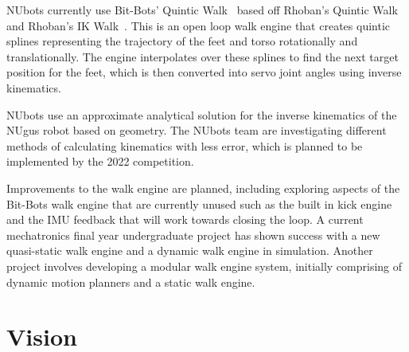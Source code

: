 \documentclass{llncs}
\begin{document}

\medskip

NUbots currently use Bit-Bots' Quintic Walk~\cite{bitbotsMotionGit} based off Rhoban's Quintic Walk~\cite{rhobanModelGit} and Rhoban's IK Walk~\cite{rhobanModelGit}. This is an open loop walk engine that creates quintic splines representing the trajectory of the feet and torso rotationally and translationally. The engine interpolates over these splines to find the next target position for the feet, which is then converted into servo joint angles using inverse kinematics.

NUbots use an approximate analytical solution for the inverse kinematics of the NUgus robot based on geometry. The NUbots team are investigating different methods of calculating kinematics with less error, which is planned to be implemented by the 2022 competition. 

Improvements to the walk engine are planned, including exploring aspects of the Bit-Bots walk engine that are currently unused such as the built in kick engine and the IMU feedback that will work towards closing the loop. A current mechatronics final year undergraduate project has shown success with a new quasi-static walk engine and a dynamic walk engine in simulation. Another project involves developing a modular walk engine system, initially comprising of dynamic motion planners and a static walk engine. 

\section{Vision}


\end{document}
